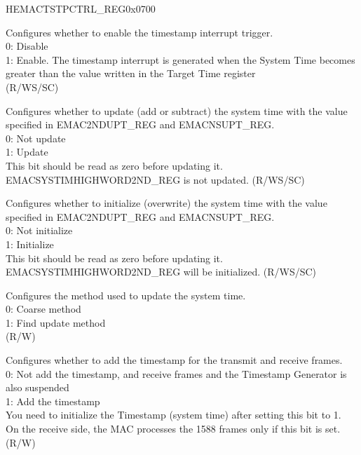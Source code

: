 \addtocounter{Regfloat}{-1}
\begin{register}{H}{EMACTSTPCTRL\_REG}{0x0700}
\begin{regdesc}\begin{reglist}
\item [Continued from the previous page...]

\item [TSTRIG] Configures whether to enable the timestamp interrupt trigger.\\
0: Disable\\
1: Enable. The timestamp interrupt is generated when the System Time becomes greater than the value written in the Target Time register\\ (R/WS/SC)
\item [TSUPDT] Configures whether to update (add or subtract) the system time with the value specified in  EMAC2NDUPT\_REG and EMACNSUPT\_REG.\\
0: Not update\\
1: Update\\
This bit should be read as zero before updating it.\\
EMACSYSTIMHIGHWORD2ND\_REG is not updated. (R/WS/SC)
\item [TSINIT] Configures whether to initialize (overwrite) the system time with the value specified in  EMAC2NDUPT\_REG and EMACNSUPT\_REG.\\
0: Not initialize\\
1: Initialize\\
This bit should be read as zero before updating it.\\
EMACSYSTIMHIGHWORD2ND\_REG will be initialized. (R/WS/SC)
\item [TSCFUPDT] Configures the method used to update the system time.\\
0: Coarse method\\
1: Find update method\\ (R/W)
\item [TSENA] Configures whether to add the timestamp for the transmit and receive frames.\\
0: Not add the timestamp, and receive frames and the Timestamp Generator is also suspended\\
1: Add the timestamp\\
You need to initialize the Timestamp (system time) after setting this bit to 1.\\
On the receive side, the MAC processes the 1588 frames only if this bit is set. (R/W)
\end{reglist}\end{regdesc}
\end{register}


